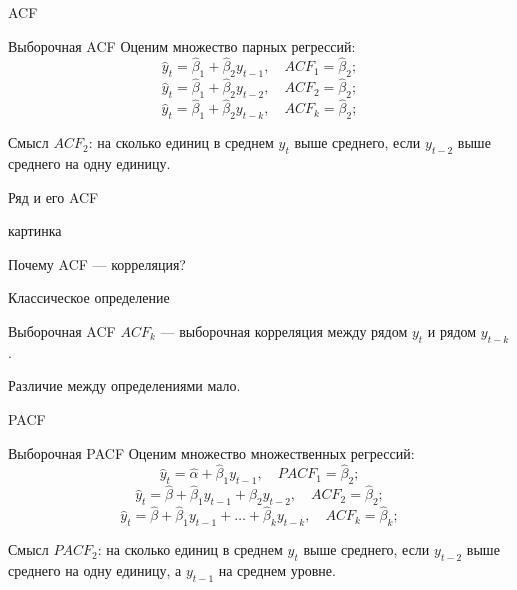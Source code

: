 \begin{frame}{ACF}

\begin{block}{Выборочная ACF}
  Оценим множество парных регрессий:
  \[
  \hat y_t = \hat\beta_1 + \hat\beta_2 y_{t-1}, \quad ACF_1 = \hat\beta_2;
  \]
  \pause
  \[
    \hat y_t = \hat\beta_1 + \hat\beta_2 y_{t-2}, \quad ACF_2 = \hat\beta_2;
  \]
  \pause
  \[
    \hat y_t = \hat\beta_1 + \hat\beta_2 y_{t-k}, \quad ACF_k = \hat\beta_2;
  \]
\end{block}

\pause
\alert{Смысл}
$ACF_2$: на сколько единиц в среднем $y_t$ выше среднего, если $y_{t-2}$ выше среднего на одну единицу.

\end{frame}


\begin{frame}{Ряд и его ACF}

картинка

\end{frame}

\begin{frame}{Почему ACF — корреляция?}

  \alert{Классическое определение}

  \begin{block}{Выборочная ACF}
    $ACF_k$ — выборочная корреляция между рядом $y_t$ и рядом $y_{t-k}$.
  \end{block}

\pause
Различие между определениями \alert{мало}. 

\end{frame}


\begin{frame}{PACF}

  \begin{block}{Выборочная PACF}
    Оценим множество множественных регрессий:
    \[
    \hat y_t = \hat\alpha + \hat\beta_1 y_{t-1}, \quad PACF_1 = \hat\beta_2;
    \]
    \pause
    \[
      \hat y_t = \hat\beta  + \hat\beta_1 y_{t-1} + \hat\beta_2 y_{t-2}, \quad ACF_2 = \hat\beta_2;
    \]
    \pause
    \[
      \hat y_t = \hat\beta + \hat\beta_1 y_{t-1} + \ldots + \hat\beta_k y_{t-k}, \quad ACF_k = \hat\beta_k;
    \]
  \end{block}
  
  \pause
  \alert{Смысл}
  $PACF_2$: на сколько единиц в среднем $y_t$ выше среднего, если $y_{t-2}$ выше среднего на одну единицу,
  а $y_{t-1}$ на среднем уровне.

  \end{frame}
  
